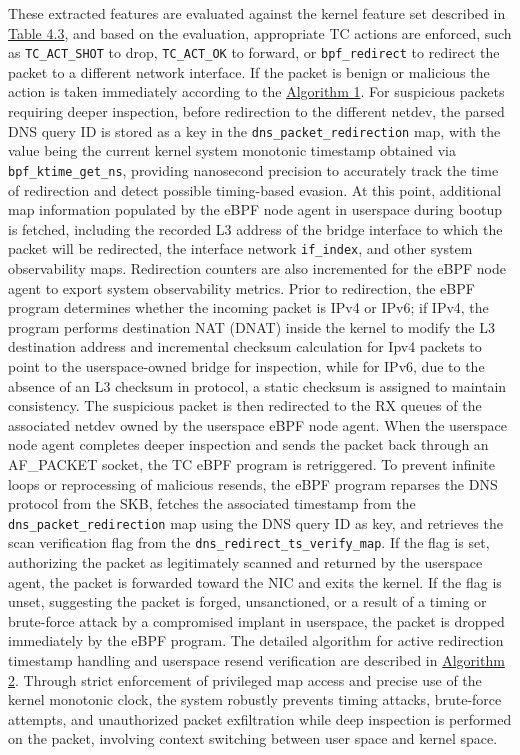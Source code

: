\documentclass [11pt, proquest] {uwthesis}[2020/02/24]
\begin{document}
These extracted features are evaluated against the kernel feature set described in \hyperref[sec:feature-kernel]{Table 4.3}, and based on the evaluation, appropriate TC actions are enforced, such as \texttt{TC\_ACT\_SHOT} to drop, \texttt{TC\_ACT\_OK} to forward, or \texttt{bpf\_redirect} to redirect the packet to a different network interface. If the packet is benign or malicious the action is taken immediately according to the \hyperref[sec:alg1]{Algorithm 1}. For suspicious packets requiring deeper inspection, before redirection to the different netdev, the parsed DNS query ID is stored as a key in the \texttt{dns\_packet\_redirection} map, with the value being the current kernel system monotonic timestamp obtained via \texttt{bpf\_ktime\_get\_ns}, providing nanosecond precision to accurately track the time of redirection and detect possible timing-based evasion. At this point, additional map information populated by the eBPF node agent in userspace during bootup is fetched, including the recorded L3 address of the bridge interface to which the packet will be redirected, the interface network \texttt{if\_index}, and other system observability maps. Redirection counters are also incremented for the eBPF node agent to export system observability metrics. Prior to redirection, the eBPF program determines whether the incoming packet is IPv4 or IPv6; if IPv4, the program performs destination NAT (DNAT) inside the kernel to modify the L3 destination address and incremental checksum calculation for Ipv4 packets to point to the userspace-owned bridge for inspection, while for IPv6, due to the absence of an L3 checksum in protocol, a static checksum is assigned to maintain consistency. The suspicious packet is then redirected to the RX queues of the associated netdev owned by the userspace eBPF node agent. When the userspace node agent completes deeper inspection and sends the packet back through an AF\_PACKET socket, the TC eBPF program is retriggered. To prevent infinite loops or reprocessing of malicious resends, the eBPF program reparses the DNS protocol from the SKB, fetches the associated timestamp from the \texttt{dns\_packet\_redirection} map using the DNS query ID as key, and retrieves the scan verification flag from the \texttt{dns\_redirect\_ts\_verify\_map}. If the flag is set, authorizing the packet as legitimately scanned and returned by the userspace agent, the packet is forwarded toward the NIC and exits the kernel. If the flag is unset, suggesting the packet is forged, unsanctioned, or a result of a timing or brute-force attack by a compromised implant in userspace, the packet is dropped immediately by the eBPF program. The detailed algorithm for active redirection timestamp handling and userspace resend verification are described in \hyperref[sec:alg2]{Algorithm 2}. Through strict enforcement of privileged map access and precise use of the kernel monotonic clock, the system robustly prevents timing attacks, brute-force attempts, and unauthorized packet exfiltration while deep inspection is performed on the packet, involving context switching between user space and kernel space.
\end{document}

